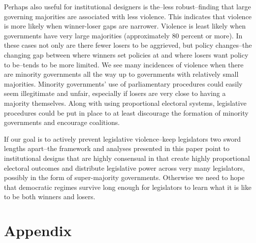 \documentclass[a4paper]{article}\usepackage{graphicx, color}
\begin{document}
Perhaps also useful for institutional designers is the--less robust--finding that large governing majorities are associated with less violence. This indicates that violence is more likely when winner-loser gaps are narrower. Violence is least likely when governments have very large majorities (approximately 80 percent or more). In these cases not only are there fewer losers to be aggrieved, but policy changes--the changing gap between where winners set policies at and where losers want policy to be--tends to be more limited. We see many incidences of violence when there are minority governments all the way up to governments with relatively small majorities. Minority governments' use of parliamentary procedures could easily seem illegitimate and unfair, especially if losers are very close to having a majority themselves. Along with using proportional electoral systems, legislative procedures could be put in place to at least discourage the formation of minority governments and encourage coalitions.

If our goal is to actively prevent legislative violence--keep legislators two sword lengths apart--the framework and analyses presented in this paper point to institutional designs that are highly consensual in that create highly proportional electoral outcomes and distribute legislative power across very many legislators, possibly in the form of super-majority governments. Otherwise we need to hope that democratic regimes survive long enough for legislators to learn what it is like to be both winners and losers.





\theendnotes


\clearpage
\section*{Appendix}
\end{document}
